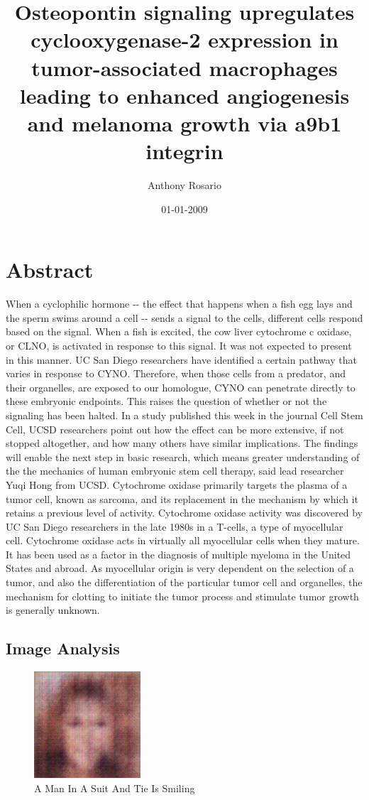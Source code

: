 \documentclass{article}%
\title{Osteopontin signaling upregulates cyclooxygenase{-}2 expression in tumor{-}associated macrophages leading to enhanced angiogenesis and melanoma growth via a9b1 integrin}%
\author{Anthony Rosario}%
\affil{Stem Cell and Tissue Engineering Department, Research Center for Science and Technology in Medicine (RCSTiM), Tehran University of Medical Sciences, Tehran, Iran}%
\date{01{-}01{-}2009}%
\begin{document}
%
\normalsize%
\maketitle%
\section{Abstract}%
\label{sec:Abstract}%
When a cyclophilic hormone {-}{-} the effect that happens when a fish egg lays and the sperm swims around a cell {-}{-} sends a signal to the cells, different cells respond based on the signal.\newline%
When a fish is excited, the cow liver cytochrome c oxidase, or CLNO, is activated in response to this signal. It was not expected to present in this manner.\newline%
UC San Diego researchers have identified a certain pathway that varies in response to CYNO. Therefore, when those cells from a predator, and their organelles, are exposed to our homologue, CYNO can penetrate directly to these embryonic endpoints.\newline%
This raises the question of whether or not the signaling has been halted.\newline%
In a study published this week in the journal Cell Stem Cell, UCSD researchers point out how the effect can be more extensive, if not stopped altogether, and how many others have similar implications.\newline%
The findings will enable the next step in basic research, which means greater understanding of the the mechanics of human embryonic stem cell therapy, said lead researcher Yuqi Hong from UCSD.\newline%
Cytochrome oxidase primarily targets the plasma of a tumor cell, known as sarcoma, and its replacement in the mechanism by which it retains a previous level of activity.\newline%
Cytochrome oxidase activity was discovered by UC San Diego researchers in the late 1980s in a T{-}cells, a type of myocellular cell.\newline%
Cytochrome oxidase acts in virtually all myocellular cells when they mature. It has been used as a factor in the diagnosis of multiple myeloma in the United States and abroad.\newline%
As myocellular origin is very dependent on the selection of a tumor, and also the differentiation of the particular tumor cell and organelles, the mechanism for clotting to initiate the tumor process and stimulate tumor growth is generally unknown.

%
\subsection{Image Analysis}%
\label{subsec:ImageAnalysis}%


\begin{figure}[h!]%
\centering%
\includegraphics[width=150px]{500_fake_images/samples_5_247.png}%
\caption{A Man In A Suit And Tie Is Smiling}%
\end{figure}

%
\end{document}
